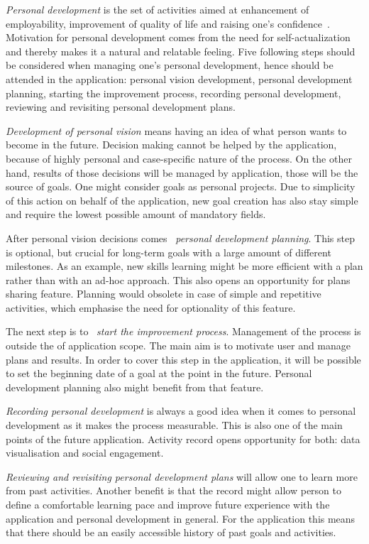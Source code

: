 \textit{Personal development} is the set of activities aimed at enhancement of employability, improvement of quality of life and raising one's confidence~\cite{what-is-personal-development}.
Motivation for personal development comes from the need for self-actualization and thereby makes it a natural and relatable feeling.
Five following steps should be considered when managing one's personal development, hence should be attended in the application:
personal vision development, personal development planning, starting the improvement process, recording personal development, reviewing and revisiting personal development plans.

\textit{Development of personal vision} means having an idea of what person wants to become in the future.
Decision making cannot be helped by the application, because of highly personal and case-specific nature of the process.
On the other hand, results of those decisions will be managed by application, those will be the source of goals.
One might consider goals as personal projects.
Due to simplicity of this action on behalf of the application, new goal creation has also stay simple and require the lowest possible amount of mandatory fields.

After personal vision decisions comes ~\textit{personal development planning}.
This step is optional, but crucial for long-term goals with a large amount of different milestones.
As an example, new skills learning might be more efficient with a plan rather than with an ad-hoc approach.
This also opens an opportunity for plans sharing feature.
Planning would obsolete in case of simple and repetitive activities, which emphasise the need for optionality of this feature.

The next step is to ~\textit{start the improvement process}.
Management of the process is outside the of application scope.
The main aim is to motivate user and manage plans and results.
In order to cover this step in the application, it will be possible to set the beginning date of a goal at the point in the future.
Personal development planning also might benefit from that feature.

\textit{Recording personal development} is always a good idea when it comes to personal development as it makes the process measurable.
This is also one of the main points of the future application.
Activity record opens opportunity for both: data visualisation and social engagement.

\textit{Reviewing and revisiting personal development plans} will allow one to learn more from past activities.
Another benefit is that the record might allow person to define a comfortable learning pace and improve future experience with the application and personal development in general.
For the application this means that there should be an easily accessible history of past goals and activities.

